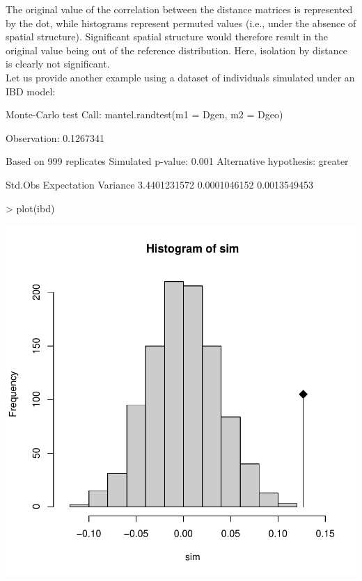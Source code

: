 \documentclass{article}
\begin{document}
\noindent The original value of the correlation between the distance matrices is represented by the
dot, while histograms represent permuted values (i.e., under the absence of spatial structure).
Significant spatial structure would therefore result in the original value being out of the
reference distribution.
Here, isolation by distance is clearly not significant.
\\


Let us provide another example using a dataset of individuals simulated under an IBD model:
\begin{Schunk}
\begin{Soutput}
Monte-Carlo test
Call: mantel.randtest(m1 = Dgen, m2 = Dgeo)

Observation: 0.1267341 

Based on 999 replicates
Simulated p-value: 0.001 
Alternative hypothesis: greater 

     Std.Obs  Expectation     Variance 
3.4401231572 0.0001046152 0.0013549453 
\end{Soutput}
\end{Schunk}
\begin{Schunk}
\begin{Sinput}
> plot(ibd)
\end{Sinput}
\end{Schunk}
\includegraphics{figs/base-087}
\end{document}
